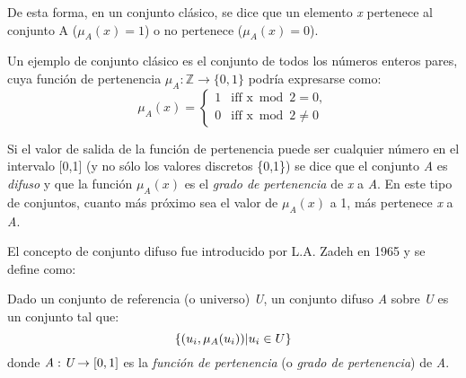 De esta forma, en un conjunto clásico, se dice que un elemento \emph{x} pertenece al conjunto A ($\mu_{A}(x)=1$) o no pertenece ($\mu_{A}(x)=0$). 
\begin{example}
\normalfont
Un ejemplo de conjunto clásico es el conjunto de todos los números enteros pares, cuya función de pertenencia $\mu_{A}:\mathbb{Z}\rightarrow\{0,1\}$ podría expresarse como:
\begin{equation}
\mu_{A}(x)=\begin{cases} 1 & \mbox{iff } \mbox{x}\bmod 2=0, \\ 0 & \mbox{iff } \mbox{x}\bmod 2\ne 0 \end{cases}
\end{equation}
\end{example}
Si el valor de salida de la función de pertenencia puede ser cualquier número en el intervalo [0,1] (y no sólo los valores discretos \{0,1\}) se dice que el conjunto \emph{A} es \emph{difuso} y que la función $\mu_{A}(x)$ es el \emph{grado de pertenencia} de \emph{x} a \emph{A}. En este tipo de conjuntos, cuanto más próximo sea el valor de $\mu_{A}(x)$ a 1, más pertenece \emph{x} a \emph{A}.

El concepto de conjunto difuso fue introducido por L.A. Zadeh en 1965 \cite{Zadeh65} y se define como:
\begin{definition}
Dado un conjunto de referencia (o universo) \emph{U}, un conjunto difuso \emph{A} sobre \emph{U} es un conjunto tal que:\\
\begin{equation}
\{(u_{i},\mu_{A}(u_{i}))\arrowvert u_{i} \in U\}
\end{equation}
donde \begin{math}\emph{A}:\emph{U}\rightarrow[0,1]\end{math} es la \emph{función de pertenencia} (o \emph{grado de pertenencia}) de \emph{A}.
\end{definition}


